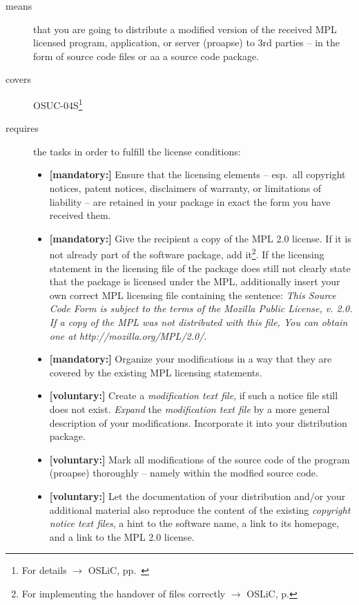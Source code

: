 \begin{description}
\item[means] that you are going to distribute a modified version of the received
MPL licensed program, application, or server (proapse) to 3rd parties -- in the
form of source code files or aa a source code package.
\item[covers] OSUC-04S\footnote{For details $\rightarrow$ OSLiC, pp.\
\pageref{OSUC-04S-DEF}}
\item[requires] the tasks in order to fulfill the license conditions:
\begin{itemize}
  
  \item \textbf{[mandatory:]} Ensure that the licensing elements -- esp.\ all
  copyright notices, patent notices, disclaimers of warranty, or limitations of
  liability -- are retained in your package in exact the form you have received
  them.

  \item \textbf{[mandatory:]} Give the recipient a copy of the MPL 2.0 license.
  If it is not already part of the software package, add it\footnote{For
  implementing the handover of files correctly $\rightarrow$ OSLiC, p.
  \pageref{DistributingFilesHint}}. If the licensing statement in the licensing
  file of the package does still not clearly state that the package is licensed
  under the MPL, additionally insert your own correct MPL licensing file
  containing the sentence: \emph{This Source Code Form is subject to the terms
  of the Mozilla Public License, v. 2.0. If a copy of the MPL was not
  distributed with this file, You can obtain one at
  http://mozilla.org/MPL/2.0/}.  
  
  \item \textbf{[mandatory:]} Organize your modifications in a way that they are
  covered by the existing MPL licensing statements.
  
  \item \textbf{[voluntary:]} Create a \emph{modification text file}, if such a
  notice file still does not exist. \emph{Expand} the \emph{modification text
  file} by a more general description of your modifications. Incorporate it into
  your distribution package.
  
  \item \textbf{[voluntary:]} Mark all modifications of the source code of the
  program (proapse) thoroughly -- namely within the modfied source code.

  \item \textbf{[voluntary:]} Let the documentation of your distribution and/or
  your additional material also reproduce the content of the existing
  \emph{copyright notice text files}, a hint to the software name, a link to its
  homepage, and a link to the MPL 2.0 license.
  

\end{itemize}
\end{description}
